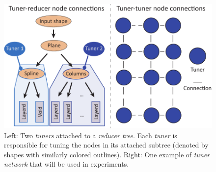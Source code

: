 \begin{figure}[h]
\centering
\includegraphics[width=0.7\linewidth]{figure/tunedrt.pdf}
\caption{ 
	Left: Two \emph{tuners} attached to a \emph{reducer tree}. Each \emph{tuner} is responsible for tuning the nodes in its attached subtree (denoted by shapes with similarly colored outlines). 
	Right: One example of \emph{tuner network} that will be used in experiments.}
\label{fig:combine}
\end{figure}
